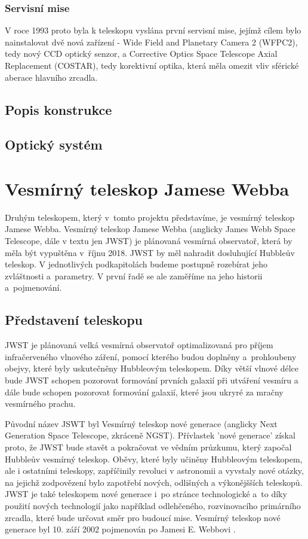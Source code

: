 \documentclass[a4paper,11pt]{article}
\begin{document}
\subsubsection{Servisní mise}
V roce 1993 proto byla k teleskopu vyslána první servisní mise, jejímž cílem bylo nainstalovat dvě nová zařízení - Wide Field and Planetary Camera 2 (WFPC2), tedy nový CCD optický senzor, a Corrective Optics Space Telescope Axial Replacement (COSTAR), tedy korektivní optika, která měla omezit vliv sférické aberace hlavního zrcadla.

\subsection{Popis konstrukce}
\subsection{Optický systém}



\section{Vesmírný teleskop Jamese Webba}

Druhým teleskopem, který v~tomto projektu představíme, je vesmírný teleskop Jamese Webba. Vesmírný teleskop Jamese Webba (anglicky James Webb Space Telescope, dále v textu jen JWST) je plánovaná vesmírná observatoř, která by měla být vypuštěna v~říjnu 2018. JWST by měl nahradit dosluhující Hubbleův teleskop. V jednotlivých podkapitolách budeme postupně rozebírat jeho zvláštnosti a~parametry. V první řadě se ale zaměříme na jeho historii a~pojmenování.

\subsection{Představení teleskopu} 
JWST je plánovaná velká vesmírná observatoř optimalizovaná pro příjem infračerveného vlnového záření, pomocí kterého budou doplněny a~prohloubeny obejvy, které byly uskutečněny Hubbleovým teleskopem.
Díky větší vlnové délce bude JWST schopen pozorovat formování prvních galaxií při utváření vesmíru a dále bude schopen pozorovat formování galaxií, které jsou ukryré za mračny vesmírného prachu.

Původní název JSWT byl Vesmírný teleskop nové generace (anglicky Next Generation Space Telescope, zkráceně NGST). Přívlastek 'nové generace' získal proto, že JWST bude stavět a pokračovat ve vědním průzkumu, který započal Hubbleův vesmírný teleskop. Oběvy, které byly učiněny Hubbleovým teleskopem, ale i ostatními teleskopy, zapříčinily revoluci v astronomii a vyvstaly nové otázky, na jejichž zodpovězení bylo zapotřebí nových, odlišných a výkonějšších teleskopů. 
JWST je také teleskopem nové generace i~po stránce technologické a~to díky použití nových technologií jako například odlehčeného, rozvinovacího primárního zrcadla, které bude určovat směr pro budoucí mise.
Vesmírný teleskop nové generace byl 10. září 2002 pojmenován po Jamesi E. Webbovi \cite{nasaFAQ}.
 
\end{document}
